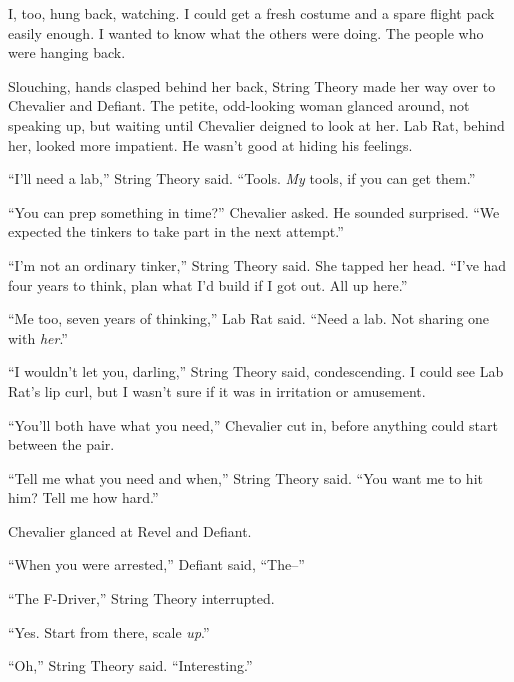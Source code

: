 I, too, hung back, watching.  I could get a fresh costume and a spare flight pack easily enough.  I wanted to know what the others were doing.  The people who were hanging back.



Slouching, hands clasped behind her back, String Theory made her way over to Chevalier and Defiant.  The petite, odd-looking woman glanced around, not speaking up, but waiting until Chevalier deigned to look at her.  Lab Rat, behind her, looked more impatient.  He wasn't good at hiding his feelings.



``I'll need a lab,'' String Theory said.  ``Tools.  \emph{My} tools, if you can get them.''



``You can prep something in time?''  Chevalier asked.  He sounded surprised.  ``We expected the tinkers to take part in the next attempt.''



``I'm not an ordinary tinker,'' String Theory said.  She tapped her head.  ``I've had four years to think, plan what I'd build if I got out.  All up here.''



``Me too, seven years of thinking,'' Lab Rat said.  ``Need a lab.  Not sharing one with \emph{her}.''



``I wouldn't let you, darling,'' String Theory said, condescending.  I could see Lab Rat's lip curl, but I wasn't sure if it was in irritation or amusement.



``You'll both have what you need,'' Chevalier cut in, before anything could start between the pair.



``Tell me what you need and when,'' String Theory said.  ``You want me to hit him?  Tell me how hard.''



Chevalier glanced at Revel and Defiant.



``When you were arrested,'' Defiant said, ``The--''



``The F-Driver,'' String Theory interrupted.



``Yes.  Start from there, scale \emph{up}.''



``Oh,'' String Theory said.  ``Interesting.''




